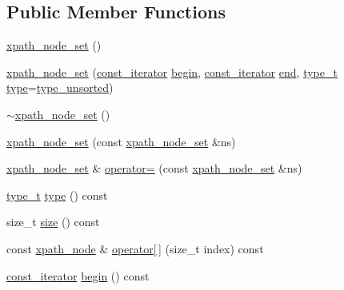 \subsection*{Public Member Functions}
\begin{DoxyCompactItemize}
\item 
\hyperlink{classpugi_1_1xpath__node__set_a1edbf222135dfdb98b5300914f51f04c}{xpath\-\_\-node\-\_\-set} ()
\item 
\hyperlink{classpugi_1_1xpath__node__set_a32752cf910fa4f2f05b4db5ec6f14917}{xpath\-\_\-node\-\_\-set} (\hyperlink{classpugi_1_1xpath__node__set_a6987510e88cea4a396d186285c174de6}{const\-\_\-iterator} \hyperlink{classpugi_1_1xpath__node__set_aad9e7dbcaabcaf47235422ebca65be34}{begin}, \hyperlink{classpugi_1_1xpath__node__set_a6987510e88cea4a396d186285c174de6}{const\-\_\-iterator} \hyperlink{classpugi_1_1xpath__node__set_a8dea1d6fc28789d909936805ed1afcd8}{end}, \hyperlink{classpugi_1_1xpath__node__set_a6c6899c8ecfbce9e42ec85540907080e}{type\-\_\-t} \hyperlink{classpugi_1_1xpath__node__set_a6b3321ac9c01da5797c4120b5683dce9}{type}=\hyperlink{classpugi_1_1xpath__node__set_a6c6899c8ecfbce9e42ec85540907080ea7636fa164710ab9b069850ea3b3e4924}{type\-\_\-unsorted})
\item 
\hyperlink{classpugi_1_1xpath__node__set_a0dc181c21aebb796d24604cfdf7f2db9}{$\sim$xpath\-\_\-node\-\_\-set} ()
\item 
\hyperlink{classpugi_1_1xpath__node__set_af0cf16db1a93d041c7a4e218807275fb}{xpath\-\_\-node\-\_\-set} (const \hyperlink{classpugi_1_1xpath__node__set}{xpath\-\_\-node\-\_\-set} \&ns)
\item 
\hyperlink{classpugi_1_1xpath__node__set}{xpath\-\_\-node\-\_\-set} \& \hyperlink{classpugi_1_1xpath__node__set_a172f28f02313c88e873efd1ca6ef358a}{operator=} (const \hyperlink{classpugi_1_1xpath__node__set}{xpath\-\_\-node\-\_\-set} \&ns)
\item 
\hyperlink{classpugi_1_1xpath__node__set_a6c6899c8ecfbce9e42ec85540907080e}{type\-\_\-t} \hyperlink{classpugi_1_1xpath__node__set_a6b3321ac9c01da5797c4120b5683dce9}{type} () const 
\item 
size\-\_\-t \hyperlink{classpugi_1_1xpath__node__set_a641551c4a14e3526bfe9d024ae6c0b28}{size} () const 
\item 
const \hyperlink{classpugi_1_1xpath__node}{xpath\-\_\-node} \& \hyperlink{classpugi_1_1xpath__node__set_ab7019c370f6657d3d2940a20f5648412}{operator\mbox{[}$\,$\mbox{]}} (size\-\_\-t index) const 
\item 
\hyperlink{classpugi_1_1xpath__node__set_a6987510e88cea4a396d186285c174de6}{const\-\_\-iterator} \hyperlink{classpugi_1_1xpath__node__set_aad9e7dbcaabcaf47235422ebca65be34}{begin} () const 

\end{DoxyCompactItemize}
